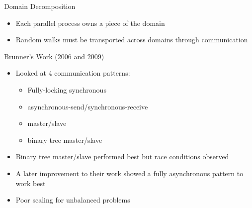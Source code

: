 \documentclass{beamer}
\begin{document}
\begin{frame}{Domain Decomposition}

  \begin{itemize}
  \item Each parallel process owns a piece of the domain
  \item Random walks must be transported across domains through
    communication
  \end{itemize}

  \begin{beamerboxesrounded}[upper=boxheadcolor,lower=boxbodycolor,shadow=true]
    {Brunner's Work (2006 and 2009)}

    \begin{itemize}
    \item Looked at 4 communication patterns:
      \begin{itemize}
      \item Fully-locking synchronous
      \item asynchronous-send/synchronous-receive
      \item master/slave
      \item binary tree master/slave
      \end{itemize}
    \item Binary tree master/slave performed best but race conditions observed
    \item A later improvement to their work showed a fully asynchronous
      pattern to work best
    \item Poor scaling for unbalanced problems
    \end{itemize}
    
  \end{beamerboxesrounded}

\end{frame}
\end{document}
